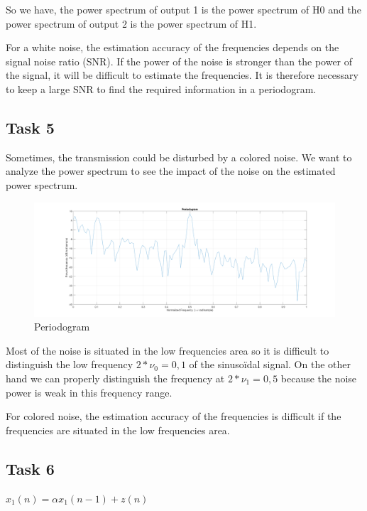 \documentclass[onecolumn, 12pt]{IEEEtran}
\begin{document}
So we have, the power spectrum of output 1 is the power spectrum of H0 and the power spectrum of output 2 is the power spectrum of H1.
\newline

For a white noise, the estimation accuracy of the frequencies depends on the signal noise ratio (SNR). If the power of the noise is stronger than the power of the signal, it will be difficult to estimate the frequencies. It is therefore necessary to keep a large SNR to find the required information in a periodogram.




\subsection*{Task 5}

Sometimes, the transmission could be disturbed by a colored noise. We want to analyze the power spectrum to see the impact of the noise on the estimated power spectrum.

\begin{multicols}{2}
\begin{figure}[H]
	\centering
	\includegraphics[scale = 0.1]{Task5.png}
	\caption{Periodogram}
\label{fig:Fig5}
\end{figure}
Most of the noise is situated in the low frequencies area so it is difficult to distinguish the low frequency $2*\nu_0 = 0,1$ of the sinusoïdal signal. On the other hand we can properly distinguish the frequency at $2*\nu_1 = 0,5$ because the noise power is weak in this frequency range.
\end{multicols}


For colored noise, the estimation accuracy of the frequencies is difficult if the frequencies are situated in the low frequencies area.

\subsection*{Task 6}
$x_1(n) = \alpha x_1(n-1) + z(n)$
\end{document}
